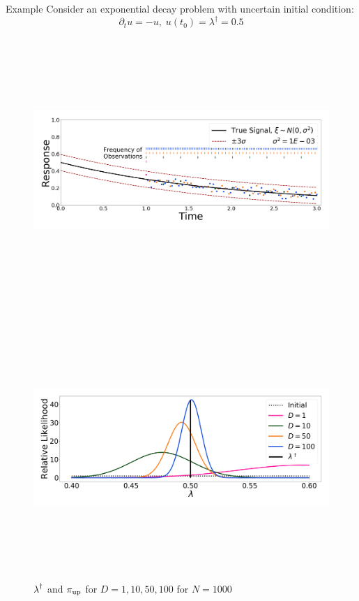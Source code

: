 \begin{block}{Example}
\centering
    Consider an exponential decay problem with uncertain initial condition:
    \begin{equation*}
        \partial_t u = - u, \; u(t_0) = \lambda^\dagger = 0.5
    \end{equation*}

    \begin{figure}
        \includegraphics[height=10cm]{exponential_decay_response_sigma-10E-4}
    \end{figure}


\vspace{1cm}

\centering
{}
\vspace{-1cm}
    \begin{figure}
        \includegraphics[height=10cm]{updated_convergence_sigma-10E-4}
        \caption*{$\operatorname*{\lambda}^\dagger$ and $\operatorname*{\pi_{up}}$ for $D=1, 10, 50, 100$ for $N=1000$}
    \end{figure}


\end{block}
